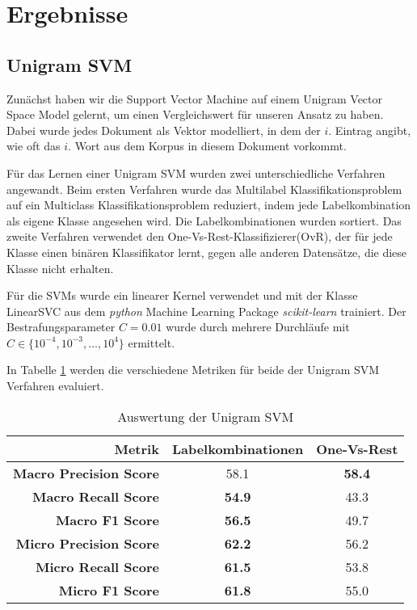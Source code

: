 \section{Ergebnisse}

\subsection{Unigram SVM}
\label{sub:unigram_svm}

Zunächst haben wir die Support Vector Machine auf einem Unigram Vector Space Model gelernt,
um einen Vergleichswert für unseren Ansatz zu haben.
Dabei wurde jedes Dokument als Vektor modelliert, in dem der $i$. Eintrag angibt, wie oft das $i$. Wort aus dem Korpus in diesem Dokument vorkommt.

Für das Lernen einer Unigram SVM wurden zwei unterschiedliche Verfahren angewandt.
Beim ersten Verfahren wurde das Multilabel Klassifikationsproblem auf ein Multiclass Klassifikationsproblem reduziert,
indem jede Labelkombination als eigene Klasse angesehen wird.
Die Labelkombinationen wurden sortiert.
Das zweite Verfahren verwendet den One-Vs-Rest-Klassifizierer(OvR), der für jede Klasse einen binären Klassifikator lernt,
gegen alle anderen Datensätze, die diese Klasse nicht erhalten.

Für die SVMs wurde ein linearer Kernel verwendet und mit der Klasse LinearSVC aus dem \emph{python} Machine Learning Package \emph{scikit-learn} \cite{scikit-learn} trainiert.
Der Bestrafungsparameter $C = 0.01$ wurde durch mehrere Durchläufe mit $C \in \{ 10^{-4},10^{-3}, \dots, 10^4 \}$ ermittelt.

In Tabelle \ref{tab:unigram_svm} werden die verschiedene Metriken für beide der Unigram SVM Verfahren evaluiert.

\begin{table}[h]
    \centering
    \begin{tabular}{r|cc}
        \small \textbf{Metrik} & \small\textbf{Labelkombinationen} & \small\textbf{One-Vs-Rest}\\
        \hline
        \small \textbf{Macro Precision Score}  & \small 58.1 & \small  \textbf{58.4}\\
        \small \textbf{Macro Recall Score}     & \small \textbf{54.9} & \small 43.3\\
        \small \textbf{Macro F1 Score}        & \small \textbf{56.5} & \small 49.7\\
        \small \textbf{Micro Precision Score} & \small \textbf{62.2} & \small 56.2\\
        \small \textbf{Micro Recall Score}    & \small \textbf{61.5} & \small 53.8\\
        \small \textbf{Micro F1 Score}        & \small \textbf{61.8} & \small 55.0\\
    \end{tabular}
    \caption{Auswertung der Unigram SVM}
    \label{tab:unigram_svm}
\end{table}

